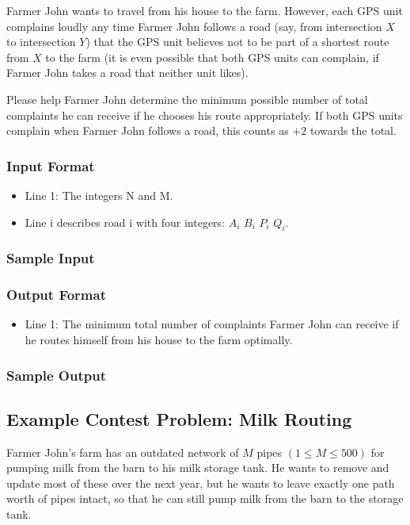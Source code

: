 Farmer John wants to travel from his house to the farm.  
However, each GPS unit complains loudly any time Farmer John follows a road (say, from intersection $X$ to intersection $Y$) that the GPS unit believes 
not to be part of a shortest route from $X$ to the farm (it is even possible that both GPS units can complain, 
if Farmer John takes a road that neither unit likes). 

Please help Farmer John determine the minimum possible number of total complaints he can receive if he chooses his route appropriately.  
If both GPS units complain when Farmer John follows a road, this counts as $+2$ towards the total.

\subsubsection{Input Format}
\begin{itemize}
	\item Line 1: The integers N and M. 
	\item Line i describes road i with four integers: $A_i$ $B_i$ $P_i$ $Q_i$. 
\end{itemize}

\subsubsection{Sample Input}

\subsubsection{Output Format}
\begin{itemize}
	\item Line 1: The minimum total number of complaints Farmer John can receive if he
        			routes himself from his house to the farm optimally.
\end{itemize}

\subsubsection{Sample Output}

\subsection{Example Contest Problem: Milk Routing\cite{milkroute}}
Farmer John's farm has an outdated network of $M$ pipes $(1 \leq M \leq 500)$ for pumping milk from the barn to his milk storage tank.  
He wants to remove and update most of these over the next year, but he wants to leave exactly one path worth of pipes intact, 
so that he can still pump milk from the barn to the storage tank.

